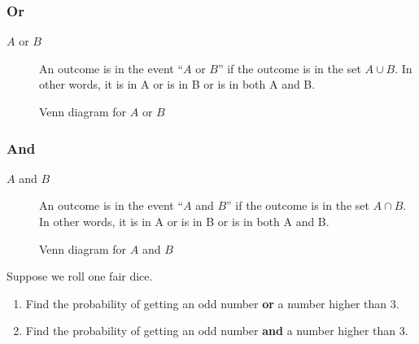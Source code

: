\begin{frame}
\frametitle{Or}
\begin{block}{}
\begin{description}
\item[$A$ or $B$] An outcome is in the event ``$A$ or $B$'' if the outcome is in the set $A \cup B$. In other words, it is in A or is in B or is in both A and B.
\end{description}
\end{block}
\begin{figure}[h!]
\centering
{}
\caption{Venn diagram for $A$ or $B$}
\end{figure}
\end{frame}

\begin{frame}
\frametitle{And}
\begin{block}{}
\begin{description}
\item[$A$ and $B$] An outcome is in the event ``$A$ and $B$'' if the outcome is in the set $A \cap B$. In other words, it is in A or is in B or is in both A and B.
\end{description}
\end{block}
\begin{figure}[h!]
\centering
{}
\caption{Venn diagram for $A$ and $B$}
\end{figure}
\end{frame}


\begin{frame}[t]
\begin{ex}
Suppose we roll one fair dice. 
\begin{enumerate}
\item Find the probability of getting an odd number \textbf{or} a number higher than 3.
\item Find the probability of getting an odd number \textbf{and} a number higher than 3.
\end{enumerate}
\end{ex}
\end{frame}


